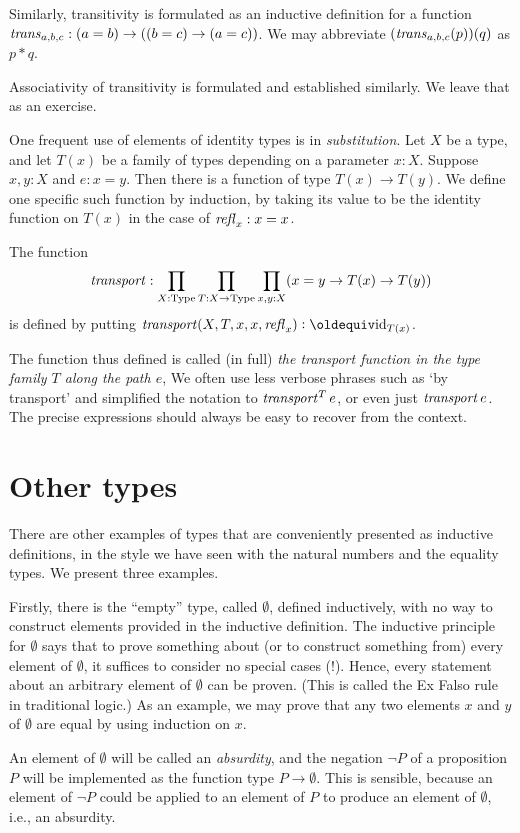 Similarly, transitivity is formulated as an inductive definition for a function $\mathop{\mathit{trans}}_{a,b,c} : (a=b) \to ((b=c) \to (a=c))$.  We may
abbreviate $(\mathop{\mathit{trans}}_{a,b,c}(p))(q)$ as $p*q$.

Associativity of transitivity is formulated and established similarly.  We leave that as an exercise.

One frequent use of elements of identity types is in {\em substitution}.  Let $X$ be a type, and let $T(x)$ be a family of types depending on a
parameter $x:X$.  Suppose $x,y:X$ and $e:x=y$.  Then there is a function of type $T(x) \to T(y)$. We define one specific such function by induction, by taking its value
to be the identity function on $T(x)$ in the case of $\mathop{{\it refl}_{x}}:x=x$.
\begin{definition}\label{def:transport} The function
\[ 
\mathop{\mathit{transport}} : \prod_{X:\mathord{\mathrm{Type}}} \prod_{T: X\to \mathord{\mathrm{Type}}} \prod_{x,y:X} (x=y \to T(x) \to T(y))
\]
is defined by putting $\trp(X,T,x,x,\refl{x})\defeq \id_{T(x)}$.
\end{definition} 
The function thus defined is called (in full)
\emph{the transport function in the type family $T$ along the path $e$},
We often use less verbose phrases such as `by transport'
and simplified the notation to $\mathop{\mathit{transport}}^T e$, or even just $\mathop{\mathit{transport}} e$.
The precise expressions should always be easy to recover from the context.

\section{Other types}

There are other examples of types that are conveniently presented as inductive definitions, in the style we have seen with the natural numbers
and the equality types.  We present three examples.

Firstly, there is the ``empty'' type, called $\emptyset$, defined inductively, with no way to construct elements provided in the inductive
definition.  The inductive principle for $\emptyset$ says that to prove something about (or to construct something from) every element of
$\emptyset$, it suffices to consider no special cases (!).  Hence, every statement about an arbitrary element of $\emptyset$ can be proven. (This is called the Ex Falso
rule in traditional logic.) As
an example, we may prove that any two elements $x$ and $y$ of $\emptyset$ are equal by using induction on $x$.

An element of $\emptyset$ will be called an {\em absurdity}, and the negation $\neg P$ of a proposition $P$ will be implemented as the function
type $P \to \emptyset$.  This is sensible, because an element of $\neg P$ could be applied to an element of $P$ to produce an element of
$\emptyset$, i.e., an absurdity.

